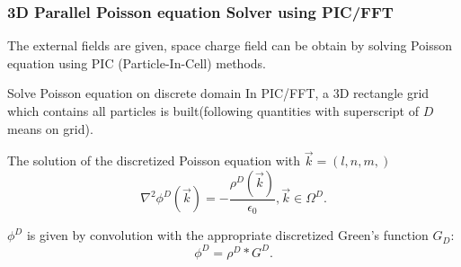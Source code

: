 \documentclass{beamer}
\begin{document}
  \begin{frame}
    \frametitle{3D Parallel Poisson equation Solver using PIC/FFT}  
    
    \begin{block}{}
     The external fields are given, space charge field can be obtain by solving 
     Poisson equation using PIC (Particle-In-Cell) methods.
    \end{block}

    \begin{block} {Solve Poisson equation on discrete domain}  
      In PIC/FFT, a 3D rectangle grid which contains all particles is built(following quantities with superscript of $D$ means on grid).
      
      The solution of the discretized Poisson equation with $\vec{k}=(l,n,m,)$
      \begin{equation*}\label{eq:DiscretizedPoisson}
	\nabla^{2} \phi^D(\vec{k}) = - \frac{\rho^D(\vec{k})}{\epsilon_0}, \vec{k} \in \Omega^D.
      \end{equation*}
      
      $\phi^D$ is given by convolution with the appropriate discretized Green's function $G_D$: 
      \begin{equation*}
	\phi^D = \rho^D * G^D.
      \end{equation*}
    \end{block}
  \end{frame}
\end{document}

